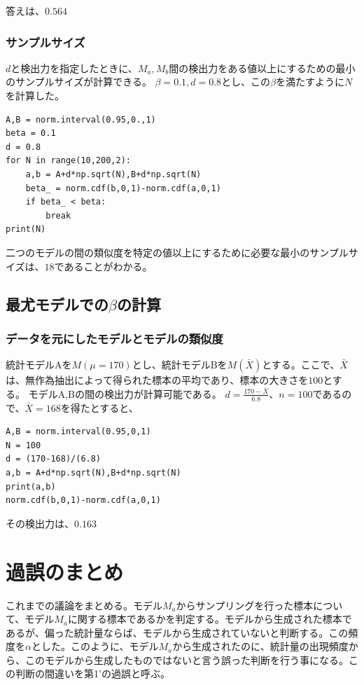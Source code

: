 答えは、$0.564$


\subsubsection{サンプルサイズ}
$d$と検出力を指定したときに、$M_a,M_b$間の検出力をある値以上にするための最小のサンプルサイズが計算できる。
$\beta=0.1,d=0.8$とし、この$\beta$を満たすように$N$を計算した。

\begin{lstlisting}
A,B = norm.interval(0.95,0.,1)
beta = 0.1
d = 0.8
for N in range(10,200,2):
    a,b = A+d*np.sqrt(N),B+d*np.sqrt(N)
    beta_ = norm.cdf(b,0,1)-norm.cdf(a,0,1)
    if beta_ < beta:
        break
print(N)
\end{lstlisting}
二つのモデルの間の類似度を特定の値以上にするために必要な最小のサンプルサイズは、$18$であることがわかる。




\subsection{最尤モデルでの$\beta$の計算}
\subsubsection{データを元にしたモデルとモデルの類似度}
統計モデルAを$M(\mu=170)$とし、統計モデルBを$M(\bar{X})$とする。ここで、$\bar{X}$は、無作為抽出によって得られた標本の平均であり、標本の大きさを$100$とする。
モデルA,Bの間の検出力が計算可能である。
$d=\frac{170-\bar{X}}{6.8}$、$n=100$であるので、$\bar{X}=168$を得たとすると、
\begin{lstlisting}
A,B = norm.interval(0.95,0,1)
N = 100
d = (170-168)/(6.8)
a,b = A+d*np.sqrt(N),B+d*np.sqrt(N)
print(a,b)
norm.cdf(b,0,1)-norm.cdf(a,0,1)
\end{lstlisting}
その検出力は、$0.163$


\section{過誤のまとめ}
これまでの議論をまとめる。モデル$M_a$からサンプリングを行った標本について、モデル$M_a$に関する標本であるかを判定する。モデルから生成された標本であるが、偏った統計量ならば、モデルから生成されていないと判断する。この頻度を$\alpha$とした。このように、モデル$M_a$から生成されたのに、統計量の出現頻度から、このモデルから生成したものではないと言う誤った判断を行う事になる。この判断の間違いを第1'の過誤と呼ぶ。

